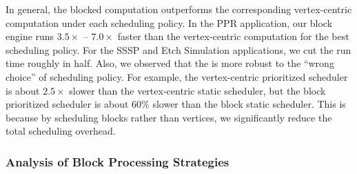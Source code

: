 In general, 
the blocked computation outperforms the corresponding vertex-centric
computation under each scheduling policy.
In the PPR application, our 
block engine runs
$3.5\times$ -- $7.0\times$ faster than the vertex-centric computation
for the best scheduling policy.  
For the SSSP and Etch Simulation applications, 
we cut the run time roughly in half.
%
%
Also, we observed that the
{\BlkModel} is more robust to the ``wrong choice'' of scheduling
policy.  For example, the vertex-centric prioritized scheduler is 
about $2.5\times$ slower than 
the vertex-centric static scheduler,
but the block prioritized scheduler is about $60\%$ slower than
the block static scheduler.  This is because by 
scheduling blocks rather than vertices, we significantly reduce the 
total scheduling overhead.

\subsubsection{Analysis of Block Processing Strategies}

